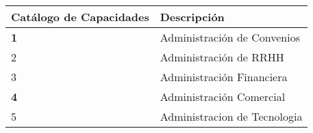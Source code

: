\begin{table}[H]
\centering
\resizebox{10cm}{!} {
\begin{tabular}{|l|l|}
\hline
\textbf{Catálogo de Capacidades} & \textbf{Descripción} \\ \hline
\textbf{1} & Administración de Convenios \\ \hline
2 & Administración de RRHH \\ \hline
3 & Administración Financiera \\ \hline
\textbf{4} & Administración Comercial \\ \hline
5 & Administracion de Tecnologia \\ \hline
\end{tabular}
}
\end{table}